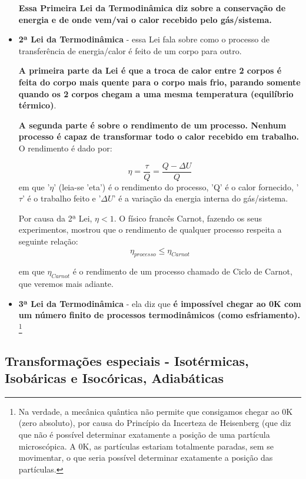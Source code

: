 \documentclass[12pt]{extarticle}
\newcommand{\<}{\langle}
\renewcommand{\>}{\rangle}
\theoremstyle{definition}
\begin{document}
\begin{itemize}
\textbf{Essa Primeira Lei da Termodinâmica diz sobre a conservação de energia e de onde vem/vai o calor recebido pelo gás/sistema.}

\item \textbf{2ª Lei da Termodinâmica} - essa Lei fala sobre como o processo de transferência de energia/calor é feito de um corpo para outro. 

\textbf{A primeira parte da Lei é que a troca de calor entre 2 corpos é feita do corpo mais quente para o corpo mais frio, parando somente quando os 2 corpos chegam a uma mesma temperatura (equilíbrio térmico)}.

\textbf{A segunda parte é sobre o rendimento de um processo. Nenhum processo é capaz de transformar todo o calor recebido em trabalho.} O rendimento é dado por:

\begin{equation}
    \eta = \frac{\tau}{Q} = \frac{Q - \Delta U}{Q}
\end{equation}
\noindent em que '$\eta$' (leia-se 'eta') é o rendimento do processo, 'Q' é o calor fornecido, '$\tau$' é o trabalho feito e '$\Delta U$' é a variação da energia interna do gás/sistema.

Por causa da 2ª Lei, $\eta < 1$. O físico francês Carnot, fazendo os seus experimentos, mostrou que o rendimento de qualquer processo respeita a seguinte relação:
\begin{equation}
    \eta_{processo} \leq \eta_{Carnot}
\end{equation}

\noindent em que $\eta_{Carnot}$ é o rendimento de um processo chamado de Ciclo de Carnot, que veremos mais adiante.

\item \textbf{3ª Lei da Termodinâmica} - ela diz que \textbf{é impossível chegar ao 0K com um número finito de processos termodinâmicos (como esfriamento).} \footnote{Na verdade, a mecânica quântica não permite que consigamos chegar ao 0K (zero absoluto), por causa do Princípio da Incerteza de Heisenberg (que diz que não é possível determinar exatamente a posição de uma partícula microscópica. A 0K, as partículas estariam totalmente paradas, sem se movimentar, o que seria possível determinar exatamente a posição das partículas.}
\end{itemize}
\subsection{Transformações especiais - Isotérmicas, Isobáricas e Isocóricas, Adiabáticas}
\end{document}
